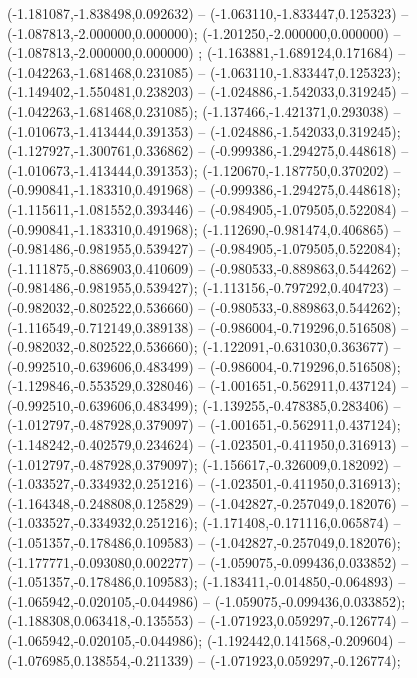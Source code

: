  (-1.181087,-1.838498,0.092632) -- (-1.063110,-1.833447,0.125323) -- (-1.087813,-2.000000,0.000000);
 (-1.201250,-2.000000,0.000000) -- (-1.087813,-2.000000,0.000000) ;
 (-1.163881,-1.689124,0.171684) -- (-1.042263,-1.681468,0.231085) -- (-1.063110,-1.833447,0.125323);
 (-1.149402,-1.550481,0.238203) -- (-1.024886,-1.542033,0.319245) -- (-1.042263,-1.681468,0.231085);
 (-1.137466,-1.421371,0.293038) -- (-1.010673,-1.413444,0.391353) -- (-1.024886,-1.542033,0.319245);
 (-1.127927,-1.300761,0.336862) -- (-0.999386,-1.294275,0.448618) -- (-1.010673,-1.413444,0.391353);
 (-1.120670,-1.187750,0.370202) -- (-0.990841,-1.183310,0.491968) -- (-0.999386,-1.294275,0.448618);
 (-1.115611,-1.081552,0.393446) -- (-0.984905,-1.079505,0.522084) -- (-0.990841,-1.183310,0.491968);
 (-1.112690,-0.981474,0.406865) -- (-0.981486,-0.981955,0.539427) -- (-0.984905,-1.079505,0.522084);
 (-1.111875,-0.886903,0.410609) -- (-0.980533,-0.889863,0.544262) -- (-0.981486,-0.981955,0.539427);
 (-1.113156,-0.797292,0.404723) -- (-0.982032,-0.802522,0.536660) -- (-0.980533,-0.889863,0.544262);
 (-1.116549,-0.712149,0.389138) -- (-0.986004,-0.719296,0.516508) -- (-0.982032,-0.802522,0.536660);
 (-1.122091,-0.631030,0.363677) -- (-0.992510,-0.639606,0.483499) -- (-0.986004,-0.719296,0.516508);
 (-1.129846,-0.553529,0.328046) -- (-1.001651,-0.562911,0.437124) -- (-0.992510,-0.639606,0.483499);
 (-1.139255,-0.478385,0.283406) -- (-1.012797,-0.487928,0.379097) -- (-1.001651,-0.562911,0.437124);
 (-1.148242,-0.402579,0.234624) -- (-1.023501,-0.411950,0.316913) -- (-1.012797,-0.487928,0.379097);
 (-1.156617,-0.326009,0.182092) -- (-1.033527,-0.334932,0.251216) -- (-1.023501,-0.411950,0.316913);
 (-1.164348,-0.248808,0.125829) -- (-1.042827,-0.257049,0.182076) -- (-1.033527,-0.334932,0.251216);
 (-1.171408,-0.171116,0.065874) -- (-1.051357,-0.178486,0.109583) -- (-1.042827,-0.257049,0.182076);
 (-1.177771,-0.093080,0.002277) -- (-1.059075,-0.099436,0.033852) -- (-1.051357,-0.178486,0.109583);
 (-1.183411,-0.014850,-0.064893) -- (-1.065942,-0.020105,-0.044986) -- (-1.059075,-0.099436,0.033852);
 (-1.188308,0.063418,-0.135553) -- (-1.071923,0.059297,-0.126774) -- (-1.065942,-0.020105,-0.044986);
 (-1.192442,0.141568,-0.209604) -- (-1.076985,0.138554,-0.211339) -- (-1.071923,0.059297,-0.126774);
